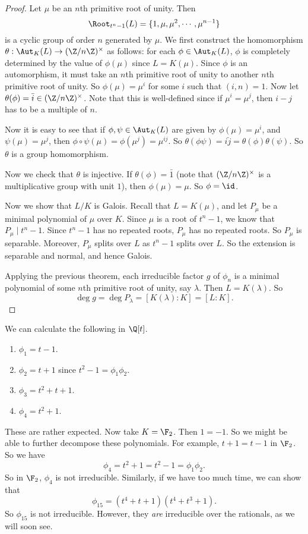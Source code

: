 \documentclass[a4paper]{article}
\begin{document}
\begin{proof}
  Let $\mu$ be an $n$th primitive root of unity. Then
  \[
    \Root_{t^n - 1}(L) = \{1, \mu, \mu^2, \cdots, \mu^{n - 1}\}
  \]
  is a cyclic group of order $n$ generated by $\mu$. We first construct the homomorphism $\theta: \Aut_K(L) \to (\Z/n\Z)^\times$ as follows: for each $\phi \in \Aut_K(L)$, $\phi$ is completely determined by the value of $\phi(\mu)$ since $L = K(\mu)$. Since $\phi$ is an automorphism, it must take an $n$th primitive root of unity to another $n$th primitive root of unity. So $\phi(\mu) = \mu^i$ for some $i$ such that $(i, n) = 1$. Now let $\theta(\phi) = \bar{i} \in (\Z/n\Z)^\times$. Note that this is well-defined since if $\mu^i = \mu^j$, then $i - j$ has to be a multiple of $n$.

  Now it is easy to see that if $\phi, \psi \in \Aut_K(L)$ are given by $\phi(\mu) = \mu^i$, and $\psi(\mu) = \mu^j$, then $\phi\circ \psi(\mu) = \phi(\mu^j) = \mu^{ij}$. So $\theta(\phi \psi) = \bar{ij} = \theta(\phi)\theta(\psi)$. So $\theta$ is a group homomorphism.

  Now we check that $\theta$ is injective. If $\theta(\phi) = \bar{1}$ (note that $(\Z/n\Z)^\times$ is a multiplicative group with unit $1$), then $\phi(\mu) = \mu$. So $\phi = \id$.

  Now we show that $L/K$ is Galois. Recall that $L = K(\mu)$, and let $P_\mu$ be a minimal polynomial of $\mu$ over $K$. Since $\mu$ is a root of $t^n - 1$, we know that $P_\mu \mid t^n - 1$. Since $t^n - 1$ has no repeated roots, $P_\mu$ has no repeated roots. So $P_\mu$ is separable. Moreover, $P_\mu$ splits over $L$ as $t^n - 1$ splits over $L$. So the extension is separable and normal, and hence Galois.

  Applying the previous theorem, each irreducible factor $g$ of $\phi_n$ is a minimal polynomial of some $n$th primitive root of unity, say $\lambda$. Then $L = K(\lambda)$. So
  \[
    \deg g = \deg P_\lambda = [K(\lambda): K] = [L:K].
  \]
\end{proof}

\begin{eg}
  We can calculate the following in $\Q[t]$.
  \begin{enumerate}
    \item $\phi_1 = t - 1$.
    \item $\phi_2 = t + 1$ since $t^2 - 1 = \phi_1 \phi_2$.
    \item $\phi_3 = t^2 + t + 1$.
    \item $\phi_4 = t^2 + 1$.
  \end{enumerate}
  These are rather expected. Now take $K = \F_2$. Then $1 = -1$. So we might be able to further decompose these polynomials. For example, $t + 1 = t - 1$ in $\F_2$. So we have
  \[
    \phi_4 = t^2 + 1 = t^2 - 1 = \phi_1 \phi_2.
  \]
  So in $\F_2$, $\phi_4$ is not irreducible. Similarly, if we have too much time, we can show that
  \[
    \phi_{15} = (t^4 + t + 1)(t^4 + t^3 + 1).
  \]
  So $\phi_{15}$ is not irreducible. However, they \emph{are} irreducible over the rationals, as we will soon see.
\end{eg}
\end{document}
